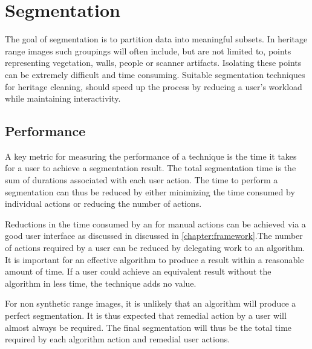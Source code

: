 \chapter{Segmentation}
The goal of segmentation is to partition data into meaningful subsets. In heritage range images such groupings will often include, but are not limited to, points representing vegetation, walls, people or scanner artifacts. Isolating these points can be extremely difficult and time consuming. Suitable segmentation techniques for heritage cleaning, should speed up the process by reducing a user's workload while maintaining interactivity.


\section{Performance}
A key metric for measuring the performance of a technique is the time it takes for a user to achieve a segmentation result. The total segmentation time is the sum of durations associated with each user action. The time to perform a segmentation can thus be reduced by either minimizing the time consumed by individual actions or reducing the number of actions.

Reductions in the time consumed by an for manual actions can be achieved via a good user interface as discussed in discussed in \ref{chapter:framework}.The number of actions required by a user can be reduced by delegating work to an algorithm. It is important for an effective algorithm to produce a result within a reasonable amount of time. If a user could achieve an equivalent result without the algorithm in less time, the technique adds no value.

For non synthetic range images, it is unlikely that an algorithm will produce a perfect segmentation. It is thus expected that remedial action by a user will almost always be required. The final segmentation will thus be the total time required by each algorithm action and remedial user actions.

